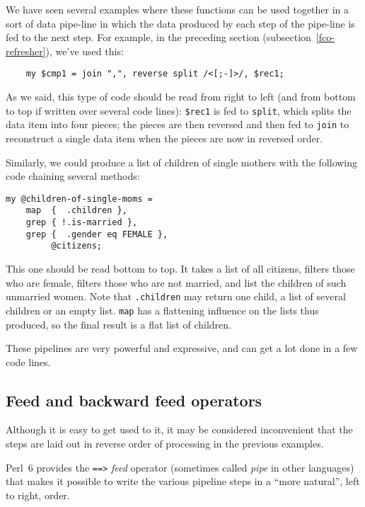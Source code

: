 We have seen several examples where these functions can 
be used together in a sort of data pipe-line in which 
the data produced by each step of the pipe-line is fed 
to the next step. For example, in the preceding section 
(subsection~\ref{fco-refresher}), we've used this:

\begin{verbatim}
    my $cmp1 = join ",", reverse split /<[;-]>/, $rec1;
\end{verbatim}
 
 
 

As we said, this type of code should be read from right 
to left (and from bottom to top if written over several 
code lines): \verb'$rec1' is fed to {\tt split}, which 
splits the data item into four pieces; the pieces are then 
reversed and then fed to {\tt join} to reconstruct a single 
data item when the pieces are now in reversed order.

Similarly, we could produce a list of children of single 
mothers with the following code chaining several methods:

\begin{verbatim}
my @children-of-single-moms =
    map  {  .children },
    grep { !.is-married },
    grep {  .gender eq FEMALE },
         @citizens;
\end{verbatim}
 
 

This one should be read bottom to top. It takes a list 
of all citizens, filters those who are female, filters 
those who are not married, and list the children of 
such unmarried women. Note that {\tt .children} may 
return one child, a list of several children or an 
empty list. {\tt map} has a flattening influence 
on the lists thus produced, so the final result is 
a flat list of children.

These pipelines are very powerful and expressive, and 
can get a lot done in a few code lines.

\subsection{Feed and backward feed operators}

Although it is easy to get used to it, it may be 
considered inconvenient that the steps are laid 
out in reverse order of processing in the previous 
examples.

Perl~6 provides the \verb'==>' \emph{feed} operator 
(sometimes called \emph{pipe} in other languages) 
that makes it possible to write the various pipeline 
steps in a ``more natural'', left to right, order.
\ifplastex \else
{}
\fi


